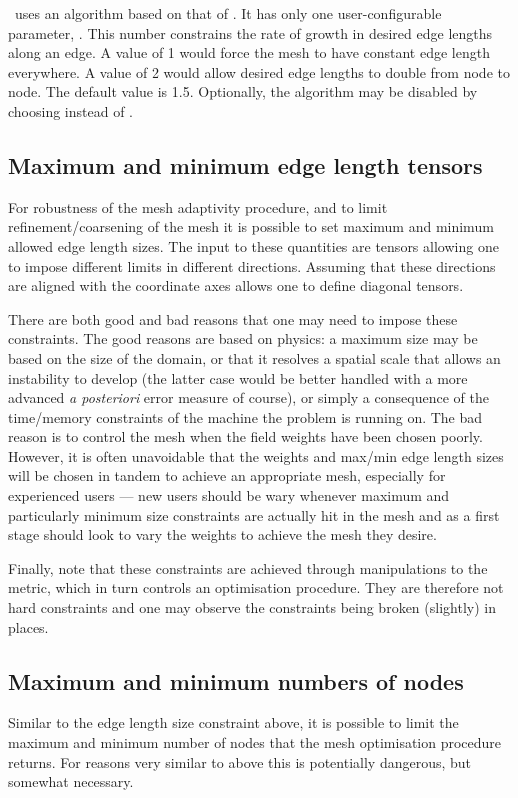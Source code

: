 \fluidity\ uses an algorithm based on that of \citet{borouchaki1998}. It has only one
user-configurable parameter, .
This number constrains the rate of growth in desired edge lengths along an edge. A value
of 1 would force the mesh to have constant edge length everywhere. A value of 2 would allow
desired edge lengths to double from node to node. The default value is 1.5. Optionally, the
algorithm may be disabled by choosing 
instead of .

\subsection{Maximum and minimum edge length tensors} \label{sec:max_min_edge_length}
For robustness of the mesh adaptivity procedure, and to limit refinement/coarsening of the
mesh it is possible to set maximum and minimum allowed edge length sizes. The input to
these quantities are tensors allowing one to impose different limits in different directions.
Assuming that these directions are aligned with the coordinate axes allows one to define
diagonal tensors.

There are both good and bad reasons that one may need to impose these constraints. The good
reasons are based on physics: a maximum size may be based on the size of the domain, or that it
resolves a spatial scale that allows an instability to develop (the latter case would be better
handled with a more advanced \emph{a posteriori} error measure of course), or simply a consequence of
the time/memory constraints of the machine the problem is running on. The bad reason is to control
the mesh when the field weights have been chosen poorly. However, it is often 
unavoidable that the weights and max/min edge length sizes will be chosen in tandem to achieve 
an appropriate mesh, especially for experienced users --- new users should be wary whenever maximum
and particularly minimum size constraints are actually hit in the mesh and as a first stage should
look to vary the weights to achieve the mesh they desire.

Finally, note that these constraints are achieved through manipulations to the metric, which in turn
controls an optimisation procedure. They are therefore not hard constraints and one may observe the
constraints being broken (slightly) in places.

\subsection{Maximum and minimum numbers of nodes} \label{sec:max_min_nodes}
Similar to the edge length size constraint above, it is possible to limit the maximum and minimum number of nodes
that the mesh optimisation procedure returns. For reasons very similar to above this is potentially dangerous, 
but somewhat necessary. 

